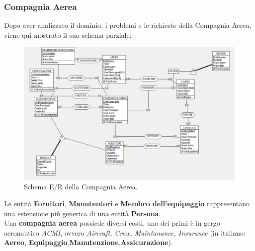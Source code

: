 

\newpage

\subsubsection{Compagnia Aerea}

\textsf{\small Dopo aver analizzato il dominio, i problemi e le richieste della Compagnia Aerea, viene qui mostrato il suo schema parziale:}

\begin{figure}[H] 
	\centering
	\includegraphics[width=1.2\linewidth, height=1.2\textheight, keepaspectratio]{./img/Schema_Concettuale/Compagnia_Aerea.png}
	\caption{Schema E/R della Compagnia Aerea.}
	\label{fig:schema_compagnia_aerea}
\end{figure}

\textsf{\small Le entità \textbf{Fornitori}, \textbf{Manutentori} e \textbf{Membro dell'equipaggio} rappresentano una estensione più generica di una entità \textbf{Persona}.  }\\

\textsf{\small Una \textbf{compagnia aerea} possiede diversi costi, uno dei primi è in gergo aeronautico \emph{ACMI}, ovvero \emph{Aircraft, Crew, Maintanance, Insurance} (in italiano: \textbf{Aereo}, \textbf{Equipaggio},\textbf{Manutenzione},\textbf{Assicurazione}).}\\

